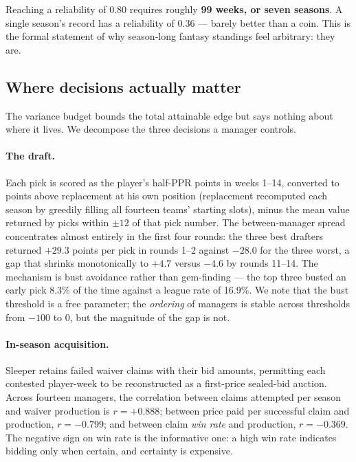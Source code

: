 \documentclass[11pt]{article}
\begin{document}
Reaching a reliability of $0.80$ requires roughly \textbf{99 weeks, or seven
seasons}. A single season's record has a reliability of $0.36$ --- barely better
than a coin. This is the formal statement of why season-long fantasy standings
feel arbitrary: they are.

\subsection{Where decisions actually matter}\label{sec:decisions}

The variance budget bounds the total attainable edge but says nothing about
where it lives. We decompose the three decisions a manager controls.

\paragraph{The draft.} Each pick is scored as the player's half-PPR points in
weeks 1--14, converted to points above replacement at his own position
(replacement recomputed each season by greedily filling all fourteen teams'
starting slots), minus the mean value returned by picks within $\pm 12$ of that
pick number. The between-manager spread concentrates almost entirely in the
first four rounds: the three best drafters returned $+29.3$ points per pick in
rounds 1--2 against $-28.0$ for the three worst, a gap that shrinks
monotonically to $+4.7$ versus $-4.6$ by rounds 11--14. The mechanism is bust
avoidance rather than gem-finding --- the top three busted an early pick 8.3\% of
the time against a league rate of 16.9\%. We note that the bust threshold is a
free parameter; the \emph{ordering} of managers is stable across thresholds from
$-100$ to $0$, but the magnitude of the gap is not.

\paragraph{In-season acquisition.} Sleeper retains failed waiver claims with
their bid amounts, permitting each contested player-week to be reconstructed as
a first-price sealed-bid auction. Across fourteen managers, the correlation
between claims attempted per season and waiver production is $r = +0.888$;
between price paid per successful claim and production, $r = -0.799$; and
between claim \emph{win rate} and production, $r = -0.369$. The negative sign on
win rate is the informative one: a high win rate indicates bidding only when
certain, and certainty is expensive.
\end{document}
